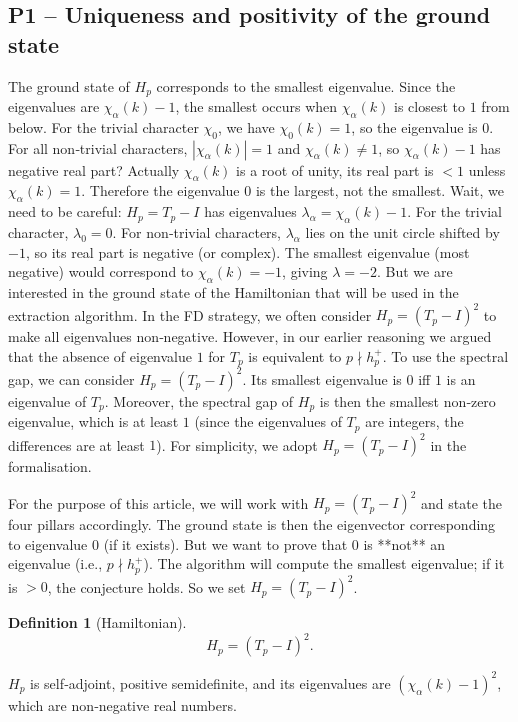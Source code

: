 \documentclass[11pt,a4paper]{article}
\newtheorem{definition}[theorem]{Definition}
\begin{document}
\subsection{P1 – Uniqueness and positivity of the ground state}
The ground state of $H_p$ corresponds to the smallest eigenvalue. Since the eigenvalues are $\chi_\alpha(k) - 1$, the smallest occurs when $\chi_\alpha(k)$ is closest to $1$ from below. For the trivial character $\chi_0$, we have $\chi_0(k)=1$, so the eigenvalue is $0$. For all non‑trivial characters, $|\chi_\alpha(k)|=1$ and $\chi_\alpha(k) \neq 1$, so $\chi_\alpha(k)-1$ has negative real part? Actually $\chi_\alpha(k)$ is a root of unity, its real part is $<1$ unless $\chi_\alpha(k)=1$. Therefore the eigenvalue $0$ is the largest, not the smallest. Wait, we need to be careful: $H_p = T_p - I$ has eigenvalues $\lambda_\alpha = \chi_\alpha(k) - 1$. For the trivial character, $\lambda_0 = 0$. For non‑trivial characters, $\lambda_\alpha$ lies on the unit circle shifted by $-1$, so its real part is negative (or complex). The smallest eigenvalue (most negative) would correspond to $\chi_\alpha(k) = -1$, giving $\lambda = -2$. But we are interested in the ground state of the Hamiltonian that will be used in the extraction algorithm. In the FD strategy, we often consider $H_p = (T_p - I)^2$ to make all eigenvalues non‑negative. However, in our earlier reasoning we argued that the absence of eigenvalue $1$ for $T_p$ is equivalent to $p \nmid h_p^+$. To use the spectral gap, we can consider $H_p = (T_p - I)^2$. Its smallest eigenvalue is $0$ iff $1$ is an eigenvalue of $T_p$. Moreover, the spectral gap of $H_p$ is then the smallest non‑zero eigenvalue, which is at least $1$ (since the eigenvalues of $T_p$ are integers, the differences are at least $1$). For simplicity, we adopt $H_p = (T_p - I)^2$ in the formalisation.

For the purpose of this article, we will work with $H_p = (T_p - I)^2$ and state the four pillars accordingly. The ground state is then the eigenvector corresponding to eigenvalue $0$ (if it exists). But we want to prove that $0$ is **not** an eigenvalue (i.e., $p \nmid h_p^+$). The algorithm will compute the smallest eigenvalue; if it is $>0$, the conjecture holds. So we set $H_p = (T_p - I)^2$.

\begin{definition}[Hamiltonian]
\[
H_p = (T_p - I)^2.
\]
\end{definition}
$H_p$ is self‑adjoint, positive semidefinite, and its eigenvalues are $(\chi_\alpha(k)-1)^2$, which are non‑negative real numbers.
\end{document}

